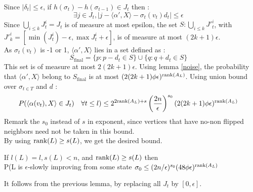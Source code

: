 Since  $|\delta_t| \leq \epsilon$, if $h(\sigma_t) - h(\sigma_{t-1}) \in J_t$ then : 
\begin{equation*}
\exists j \in J_t, |j - \langle\alpha ', X \rangle -   \sigma_t(v_t)d_t| \leq \epsilon
\end{equation*}
Since $\bigcup_{i \leq k} J^i_t = J_t$ is of measure at most epsilon, the set $S : \bigcup_{i \leq k} J'^i_t$, with $J'^i_k = [\min(J^i_t) - \epsilon, \max J^i_t + \epsilon]$, is of measure at most $(2k+ 1)\epsilon$. \\
As $\sigma_t(v_t)$ is -1 or 1, $\langle\alpha ', X \rangle$ lies in a set defined as :
\begin{equation*}
S_{\text{final}} = \{p : p - d_t \in S\} \cup \{q:  q + d_t \in S\}
\end{equation*}
This set is of measure at most $2(2k + 1) \epsilon$. Using lemma \ref{noise}, the probability that $\langle\alpha ', X \rangle$ belong to $S_{\text{final}}$ is at most $(2(2k + 1)\phi\epsilon)^{\text{rank}(A_L)}$. Using union bound over $\sigma_{t \in T}$ and $d$ :
\begin{equation*}
P(\langle \alpha(v_t), X \rangle \in J_t) \quad \forall t\leq l) \leq 2^{2\text{rank}(A_L) + s}\left(\frac{2n}{\epsilon}\right)^{s_0}(2(2k+1)\phi\epsilon)^{\text{rank}(A_L)}
\end{equation*}
Remark the $s_0$ instead of $s$ in exponent, since vertices that have no-non flipped neighbors need not be taken in this bound. \\
By using  $\text{rank}(L) \geq s(L)$, we get the desired bound. \\

\begin{corollary}
\label{cor::boundN}
If $l(L) = l, s(L) < n$, and $\text{rank}(L) \geq s(L)$ then \\
P(L is $\epsilon$-slowly improving from some state $\sigma_0 \leq (2n/\epsilon)^{s_0}(48\phi\epsilon)^{\text{rank}(A_L)}$
\end{corollary}

It follows from the previous lemma, by replacing all $J_t$ by $[0, \epsilon]$.